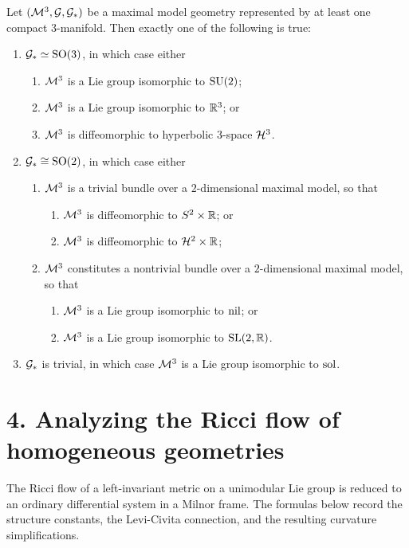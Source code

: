 \begin{proposition}
\label{ch01-prop-classification-maximal-models}
Let $(\mathcal{M}^3,\mathcal{G},\mathcal{G}_*)$ be a maximal model geometry represented by at least one compact $3$-manifold. Then exactly one of the following is true:
\begin{enumerate}
\item $\mathcal{G}_* \simeq \mathrm{SO}(3)$, in which case either
\begin{enumerate}
\item $\mathcal{M}^3$ is a Lie group isomorphic to $\mathrm{SU}(2)$;
\item $\mathcal{M}^3$ is a Lie group isomorphic to $\mathbb{R}^3$; or
\item $\mathcal{M}^3$ is diffeomorphic to hyperbolic $3$-space $\mathcal{H}^3$.
\end{enumerate}
\item $\mathcal{G}_* \cong \mathrm{SO}(2)$, in which case either
\begin{enumerate}
\item $\mathcal{M}^3$ is a trivial bundle over a $2$-dimensional maximal model, so that
\begin{enumerate}
\item $\mathcal{M}^3$ is diffeomorphic to $S^2 \times \mathbb{R}$; or
\item $\mathcal{M}^3$ is diffeomorphic to $\mathcal{H}^2 \times \mathbb{R}$;
\end{enumerate}
\item $\mathcal{M}^3$ constitutes a nontrivial bundle over a $2$-dimensional maximal model, so that
\begin{enumerate}
\item $\mathcal{M}^3$ is a Lie group isomorphic to $\mathrm{nil}$; or
\item $\mathcal{M}^3$ is a Lie group isomorphic to $\mathrm{SL}(2,\mathbb{R})$.
\end{enumerate}
\end{enumerate}
\item $\mathcal{G}_*$ is trivial, in which case $\mathcal{M}^3$ is a Lie group isomorphic to $\mathrm{sol}$.
\end{enumerate}
\end{proposition}

\section*{4. Analyzing the Ricci flow of homogeneous geometries}

The Ricci flow of a left-invariant metric on a unimodular Lie group is reduced to an ordinary differential system in a Milnor frame. The formulas below record the structure constants, the Levi-Civita connection, and the resulting curvature simplifications.

